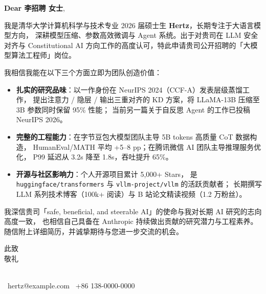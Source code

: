 \documentclass[zh,nofooter]{resume-pro}
\begin{document}
\thispagestyle{empty}


\noindent
\textbf{Dear 李招聘 女士},
\par\vspace{0.6em}

\noindent
我是清华大学计算机科学与技术专业 2026 届硕士生 \textbf{Hertz}，长期专注于大语言模型方向，
深耕模型压缩、参数高效微调与 Agent 系统。出于对贵司在 LLM 安全对齐与 Constitutional AI
方向工作的高度认可，特此申请贵司公开招聘的「大模型算法工程师」岗位。
\par\vspace{0.4em}

\noindent
我相信我能在以下三个方面立即为团队创造价值：
\begin{itemize}
  \item \textbf{扎实的研究品味}：以一作身份在 NeurIPS 2024（CCF-A）发表层级蒸馏工作，
        提出注意力 / 隐层 / 输出三重对齐的 KD 方案，将 LLaMA-13B 压缩至 3B 参数同时保留 95\% 性能；
        当前另一篇关于自反思 Agent 的工作已投稿 NeurIPS 2026。
  \item \textbf{完整的工程能力}：在字节豆包大模型团队主导 5B tokens 高质量 CoT 数据构造，
        HumanEval/MATH 平均 +5--8 pp；在腾讯微信 AI 团队主导推理服务优化，
        P99 延迟从 3.2s 降至 1.8s，吞吐提升 65\%。
  \item \textbf{开源与社区影响力}：个人开源项目累计 5,000+ Stars，
        是 \texttt{huggingface/transformers} 与 \texttt{vllm-project/vllm} 的活跃贡献者；
        长期撰写 LLM 系列技术博客（100k+ 阅读）与 B 站论文精读视频（1.2 万粉丝）。
\end{itemize}

\par\vspace{0.4em}
\noindent
我深信贵司「safe, beneficial, and steerable AI」的使命与我对长期 AI 研究的志向高度一致，
也相信自己具备在 Anthropic 持续做出贡献的研究潜力与工程素养。
随信附上详细简历，并诚挚期待与您进一步交流的机会。

\par\vspace{0.6em}
\noindent
此致\\[-0.1em]
敬礼
\par\vspace{1.2em}
\noindent
\rpName \\
{\small\color{mutedcolor}\faEnvelope\ hertz@example.com \quad \faPhone\ +86 138-0000-0000}
\end{document}

